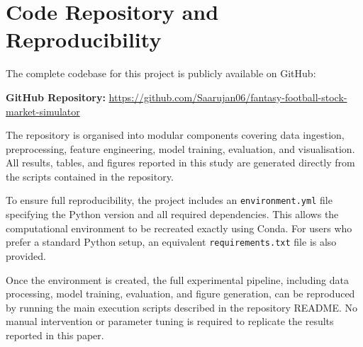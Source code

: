 \documentclass[11pt,a4paper]{article}
\begin{document}
\section{Code Repository and Reproducibility}
\label{app:code}

The complete codebase for this project is publicly available on GitHub:

\noindent
\textbf{GitHub Repository:} \url{https://github.com/Saarujan06/fantasy-football-stock-market-simulator}

The repository is organised into modular components covering data ingestion, preprocessing, feature engineering, model training, evaluation, and visualisation. All results, tables, and figures reported in this study are generated directly from the scripts contained in the repository.

To ensure full reproducibility, the project includes an \texttt{environment.yml} file specifying the Python version and all required dependencies. This allows the computational environment to be recreated exactly using Conda. For users who prefer a standard Python setup, an equivalent \texttt{requirements.txt} file is also provided.

Once the environment is created, the full experimental pipeline, including data processing, model training, evaluation, and figure generation, can be reproduced by running the main execution scripts described in the repository README. No manual intervention or parameter tuning is required to replicate the results reported in this paper.
\end{document}
